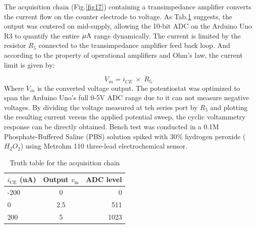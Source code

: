 \documentclass[conference]{IEEEtran}
\begin{document}
The acquisition chain (Fig.\ref{fig17}) containing a transimpedance amplifier converts the current flow on the counter electrode to voltage. As Tab.\ref{tab2} suggests, the output was centered on mid-supply, allowing the 10-bit ADC on the Arduino Uno R3 to quantify the entire $\mu\text A$ range dynamically. The current is limited by the resistor $R_{5}$ connected to the transimpedance amplifier feed back loop. And according to the property of operational amplifiers and Ohm's law, the current limit is given by: 

\begin{equation} V_{in} = i_{CE}\;\times \;R_{5}\end{equation}
Where $V_{in}$ is the converted voltage output. The potentiostat was optimized to span the Arduino Uno's full 0-5V ADC range due to it can not measure negative voltages. By dividing the voltage measured at teh series port by $R_{5}$ and plotting the resulting current versus the applied potential sweep, the cyclic voltammetry response can be directly obtained. Bench test was conducted in a 0.1M Phosphate-Buffered Saline (PBS) solution spiked with 30\% hydrogen peroxide ($H_2O_2$) using Metrohm 110 three-lead electrochemical sensor. 

\begin{table}[ht]
  \centering
  \begin{tabular}{|l|c|r|}
    \hline
    \textbf{$i_{\mathrm{CE}}$ (uA)} &  \textbf{Output $v_{\mathrm{in}}$} &\textbf{ADC level} \\ 
    \hline
    -200   & 0&  0  \\
    0 & 2.5&  511  \\
    200 & 5& 1023  \\ 
    \hline
  \end{tabular}
  \caption{Truth table for the acquisition chain}
  \label{tab2}
\end{table}
\end{document}
